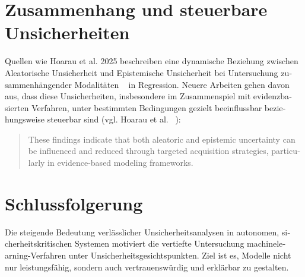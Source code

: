 \begin{otherlanguage}{ngerman}

\section{Zusammenhang und steuerbare Unsicherheiten}

Quellen wie Hoarau et al. 2025 beschreiben eine dynamische Beziehung zwischen \gls{Aleatorische Unsicherheit} und \gls{Epistemische Unsicherheit} bei Untersuchung zusammenhängender Modalitäten ~\parencite[S. 2, Z.]{ArthurHoarau2025} in Regression. Neuere Arbeiten gehen davon aus, dass diese Unsicherheiten, insbesondere im Zusammenspiel mit evidenzbasierten Verfahren, unter bestimmten Bedingungen gezielt beeinflussbar beziehungsweise steuerbar sind (vgl. Hoarau et al. ~\parencite[S. 2, Z. 43-45]{ArthurHoarau2025}): 

\begin{quote}
\glqq These findings indicate that both aleatoric and epistemic uncertainty can be influenced and reduced through targeted acquisition strategies, particularly in evidence-based modeling frameworks. \grqq 
\end{quote}

\section{Schlussfolgerung}
Die steigende Bedeutung verlässlicher Unsicherheitsanalysen in autonomen, sicherheitskritischen Systemen motiviert die vertiefte Untersuchung \gls{machinelearning}-Verfahren unter Unsicherheitsgesichtspunkten. Ziel ist es, Modelle nicht nur leistungsfähig, sondern auch vertrauenswürdig und erklärbar zu gestalten.



\end{otherlanguage}
